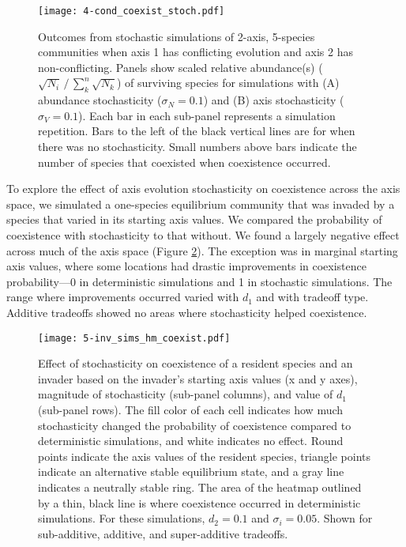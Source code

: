 \begin{figure}[ht!]
\centering
\texttt{[image: 4-cond\_coexist\_stoch.pdf]}
\caption{Outcomes from stochastic simulations of 2-axis, 5-species communities 
    when axis 1 has conflicting evolution and axis 2 has non-conflicting.
    Panels show scaled relative abundance(s)
    ($\sqrt{N_i} \, / \, \sum_k^n{\sqrt{N_k}}$) 
    of surviving species for simulations with
    (A) abundance stochasticity ($\sigma_N = 0.1$) and
    (B) axis stochasticity ($\sigma_V = 0.1$).
    Each bar in each sub-panel represents a simulation repetition.
    Bars to the left of the black vertical lines are for when there was no 
    stochasticity.
    Small numbers above bars indicate the number of species that coexisted
    when coexistence occurred.}
\label{fig:conditional-coexistence-stoch}
\end{figure}



To explore the effect of axis evolution stochasticity on coexistence across 
the axis space,
we simulated a one-species equilibrium community that was invaded by 
a species that varied in its starting axis values.
We compared the probability of coexistence with stochasticity to that without.
We found a largely negative effect across much of the axis space
(Figure \ref{fig:inv-sims-heatmap-coexist}).
The exception was in marginal starting axis values, where some locations
had drastic improvements in coexistence probability---0 in deterministic 
simulations and 1 in stochastic simulations.
The range where improvements occurred varied with $d_1$ and with tradeoff type.
Additive tradeoffs showed no areas where stochasticity helped coexistence.

\begin{figure}[ht!]
\centering
\texttt{[image: 5-inv\_sims\_hm\_coexist.pdf]}
\caption{Effect of stochasticity on coexistence of a resident species and 
    an invader based on the invader's starting axis values (x and y axes),
    magnitude of stochasticity (sub-panel columns), and 
    value of $d_1$ (sub-panel rows).
    The fill color of each cell indicates how much stochasticity changed
    the probability of coexistence compared to deterministic simulations,
    and white indicates no effect.
    Round points indicate the axis values of the resident species,
    triangle points indicate an alternative stable equilibrium state, 
    and a gray line indicates a neutrally stable ring.
    The area of the heatmap outlined by a thin, black line is where
    coexistence occurred in deterministic simulations.
    For these simulations, $d_2 = 0.1$ and $\sigma_i = 0.05$.
    Shown for sub-additive, additive, and super-additive tradeoffs.}
\label{fig:inv-sims-heatmap-coexist}
\end{figure}
